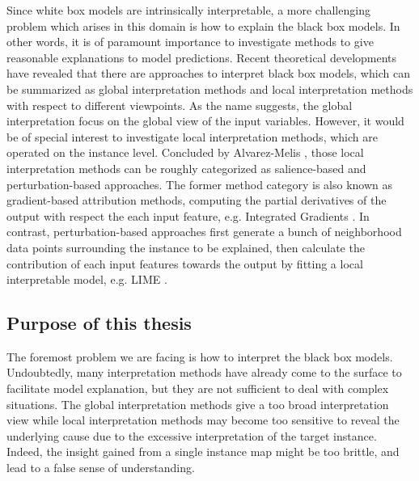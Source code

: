Since white box models are intrinsically interpretable, a more challenging problem which arises in this domain is how to explain the black box models. In other words, it is of paramount importance to investigate methods to give reasonable explanations to model predictions. Recent theoretical developments have revealed that there are approaches to interpret black box models, which can be summarized as global interpretation methods and local interpretation methods with respect to different viewpoints. As the name suggests, the global interpretation focus on the global view of the input variables. However, it would be of special interest to investigate local interpretation methods, which are operated on the instance level. Concluded by Alvarez-Melis \cite{alvarez2018robustness}, those local interpretation methods can be roughly categorized as salience-based and perturbation-based approaches. The former method category is also known as gradient-based attribution methods, computing the partial derivatives of the output with respect the each input feature, e.g. Integrated Gradients \cite{selvaraju2017grad}\cite{sundararajan2017axiomatic}. In contrast, perturbation-based approaches first generate a bunch of neighborhood data points surrounding the instance to be explained, then calculate the contribution of each input features towards the output by fitting a local interpretable model, e.g. LIME \cite{ribeiro2016model}. 

\subsection{Purpose of this thesis}


The foremost problem we are facing is how to interpret the black box models. Undoubtedly, many interpretation methods have already come to the surface to facilitate model explanation, but they are not sufficient to deal with complex situations. The global interpretation methods give a too broad interpretation view while local interpretation methods may become too sensitive to reveal the underlying cause due to the excessive interpretation of the target instance. Indeed, the insight gained from a single instance map might be too brittle, and lead to a false sense of understanding.

